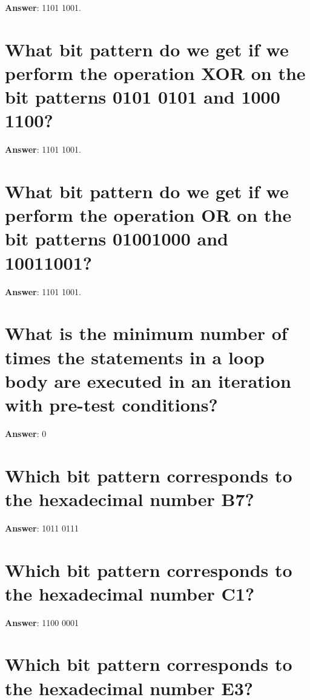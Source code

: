 \documentclass[a4paper,11pt,oneside]{book}
\begin{document}
\begin{sloppypar}
\label{q:417:sa:en:True}

\textbf{Answer}: 1101 1001.



\section{What bit pattern do we get if we perform the operation XOR on the bit patterns 0101 0101 and 1000 1100?}

\label{q:418:sa:en:True}

\textbf{Answer}: 1101 1001.



\section{What bit pattern do we get if we perform the operation OR on the bit patterns 01001000 and 10011001?}

\label{q:419:sa:en:True}

\textbf{Answer}: 1101 1001.



\section{What is the minimum number of times the statements in a loop body are executed in an iteration with pre-test conditions?}

\label{q:420:sa:en:True}

\textbf{Answer}: 0



\section{Which bit pattern corresponds to the hexadecimal number B7?}

\label{q:421:sa:en:True}

\textbf{Answer}: 1011 0111



\section{Which bit pattern corresponds to the hexadecimal number C1?}

\label{q:422:sa:en:True}

\textbf{Answer}: 1100 0001



\section{Which bit pattern corresponds to the hexadecimal number E3?}


\end{sloppypar}
\end{document}
